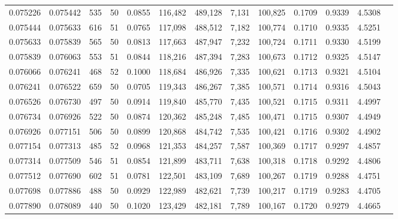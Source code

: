 \begin{tabular}{rrrrrrrrrrrrr}
0.075226 & 0.075442 &   535 &  50 &                                     0.0855 & 116,482 & 489,128 &   7,131 & 100,825 & 0.1709 & 0.9339 & 4.5308 \\
0.075444 & 0.075633 &   616 &  51 &                                     0.0765 & 117,098 & 488,512 &   7,182 & 100,774 & 0.1710 & 0.9335 & 4.5251 \\
0.075633 & 0.075839 &   565 &  50 &                                     0.0813 & 117,663 & 487,947 &   7,232 & 100,724 & 0.1711 & 0.9330 & 4.5199 \\
0.075839 & 0.076063 &   553 &  51 &                                     0.0844 & 118,216 & 487,394 &   7,283 & 100,673 & 0.1712 & 0.9325 & 4.5147 \\
0.076066 & 0.076241 &   468 &  52 &                                     0.1000 & 118,684 & 486,926 &   7,335 & 100,621 & 0.1713 & 0.9321 & 4.5104 \\
0.076241 & 0.076522 &   659 &  50 &                                     0.0705 & 119,343 & 486,267 &   7,385 & 100,571 & 0.1714 & 0.9316 & 4.5043 \\
0.076526 & 0.076730 &   497 &  50 &                                     0.0914 & 119,840 & 485,770 &   7,435 & 100,521 & 0.1715 & 0.9311 & 4.4997 \\
0.076734 & 0.076926 &   522 &  50 &                                     0.0874 & 120,362 & 485,248 &   7,485 & 100,471 & 0.1715 & 0.9307 & 4.4949 \\
0.076926 & 0.077151 &   506 &  50 &                                     0.0899 & 120,868 & 484,742 &   7,535 & 100,421 & 0.1716 & 0.9302 & 4.4902 \\
0.077154 & 0.077313 &   485 &  52 &                                     0.0968 & 121,353 & 484,257 &   7,587 & 100,369 & 0.1717 & 0.9297 & 4.4857 \\
0.077314 & 0.077509 &   546 &  51 &                                     0.0854 & 121,899 & 483,711 &   7,638 & 100,318 & 0.1718 & 0.9292 & 4.4806 \\
0.077512 & 0.077690 &   602 &  51 &                                     0.0781 & 122,501 & 483,109 &   7,689 & 100,267 & 0.1719 & 0.9288 & 4.4751 \\
0.077698 & 0.077886 &   488 &  50 &                                     0.0929 & 122,989 & 482,621 &   7,739 & 100,217 & 0.1719 & 0.9283 & 4.4705 \\
0.077890 & 0.078089 &   440 &  50 &                                     0.1020 & 123,429 & 482,181 &   7,789 & 100,167 & 0.1720 & 0.9279 & 4.4665 \\

\end{tabular}

